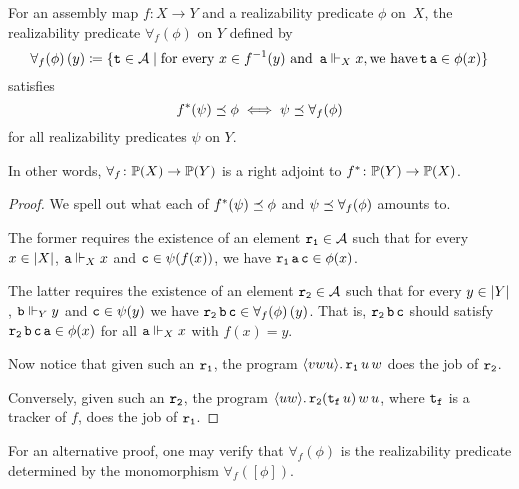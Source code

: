\begin{proposition}
  For an assembly map \(f \colon X \to Y\) and a realizability predicate
  \(\phi\) on~\(X\), the realizability predicate \(\forall_f(\phi)\) on \(Y\)
  defined by
  \[
    {\forall_f(\phi)}\,(y) \coloneqq
    \{\operatorname{\mathtt{t}} \in \mathcal A \mid
      \text{for every } x \in f^{-1}(y) \text{ and } \operatorname{\mathtt{a}} \Vdash_X x, \text{we have}
      \operatorname{\mathtt{t}}\operatorname{\mathtt{a}} \in \phi(x)\}
  \]
  satisfies
  \[
    f^\ast(\psi) \preceq \phi \iff \psi \preceq \forall_f(\phi)
  \]
  for all realizability predicates \(\psi\) on \(Y\).

  In other words, \(\forall_f \colon \mathbb P(X) \to \mathbb P(Y)\) is a right
  adjoint to \(f^\ast \colon \mathbb P(Y) \to \mathbb P(X)\).
\end{proposition}
\begin{proof}
  We spell out what each of \(f^\ast(\psi) \preceq \phi\) and
  \(\psi \preceq \forall_f(\phi)\) amounts to.

  The former requires the existence of an element \(\operatorname{\mathtt{r_1}} \in \mathcal A\) such that
  for every \(x \in \lvert X\rvert\), \(\operatorname{\mathtt{a}} \Vdash_X x\) and
  \(\operatorname{\mathtt{c}} \in \psi(f(x))\), we have \(\operatorname{\mathtt{r_1}}\operatorname{\mathtt{a}}\operatorname{\mathtt{c}} \in \phi(x)\).

  The latter requires the existence of an element \(\operatorname{\mathtt{r_2}} \in \mathcal A\) such
  that for every \(y \in \lvert Y\rvert\), \(\operatorname{\mathtt{b}} \Vdash_Y y\) and
  \(\operatorname{\mathtt{c}} \in \psi(y)\) we have
  \(\operatorname{\mathtt{r_2}}\operatorname{\mathtt{b}}\operatorname{\mathtt{c}} \in \forall_f(\phi)\,(y)\).
  That is, \(\operatorname{\mathtt{r_2}}\operatorname{\mathtt{b}}\operatorname{\mathtt{c}}\) should satisfy
  \(\operatorname{\mathtt{r_2}}\operatorname{\mathtt{b}}\operatorname{\mathtt{c}}\operatorname{\mathtt{a}} \in \phi(x)\) for all
  \(\operatorname{\mathtt{a}} \Vdash_X x\) with \(f(x) = y\).

  Now notice that given such an \(\operatorname{\mathtt{r_1}}\), the program
  \(\langle{{vwu}}\rangle.\,{\operatorname{\mathtt{r_1}}u\,w}\) does the job of \(\operatorname{\mathtt{r_2}}\).

  Conversely, given such an \(\operatorname{\mathtt{r_2}}\), the program
  \(\langle{{uw}}\rangle.\,{\operatorname{\mathtt{r_2}}(\operatorname{\mathtt{t_f}}u)\,w\,u}\), where \(\operatorname{\mathtt{t_f}}\) is a
  tracker of \(f\), does the job of \(\operatorname{\mathtt{r_1}}\).
\end{proof}

For an alternative proof, one may verify that \(\forall_f(\phi)\) is the
realizability predicate determined by the monomorphism \(\forall_f([\phi])\).

